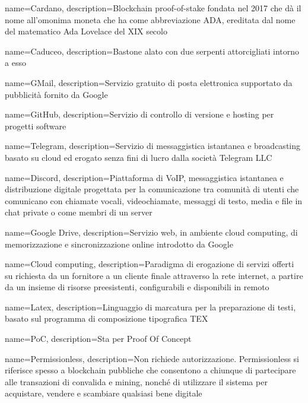 {
	name={Cardano},
	description={Blockchain\glo{} proof-of-stake fondata nel 2017 che dà il nome all'omonima moneta che ha come abbreviazione ADA, ereditata dal nome del matematico Ada Lovelace del XIX secolo}
}

{
	name={Caduceo},
	description={Bastone alato con due serpenti attorcigliati intorno a esso}
}

{
	name={GMail},
	description={Servizio gratuito di posta elettronica supportato da pubblicità fornito da Google}
}

{
	name={GitHub},
	description={Servizio di controllo di versione e hosting per progetti software}
}

{
	name={Telegram},
	description={Servizio di messaggistica istantanea e broadcasting basato su cloud ed erogato senza fini di lucro dalla società Telegram LLC}
}

{
	name={Discord},
	description={Piattaforma di VoIP, messaggistica istantanea e distribuzione digitale progettata per la comunicazione tra comunità di utenti che comunicano con chiamate vocali, videochiamate, messaggi di testo, media e file in chat private o come membri di un server}
}

{
	name={Google Drive},
	description={Servizio web, in ambiente cloud computing\glo{}, di memorizzazione e sincronizzazione online introdotto da Google}
}

{
	name={Cloud computing},
	description={Paradigma di erogazione di servizi offerti su richiesta da un fornitore a un cliente finale attraverso la rete internet, a partire da un insieme di risorse preesistenti, configurabili e disponibili in remoto}
}

{
	name={Latex},
	description={Linguaggio di marcatura per la preparazione di testi, basato sul programma di composizione tipografica TEX}
}

{
	name={PoC},
	description={Sta per Proof Of Concept\glo}
}

{
	name={Permissionless},
	description={Non richiede autorizzazione. Permissionless si riferisce spesso a blockchain pubbliche che consentono a chiunque di partecipare alle transazioni di convalida e mining, nonché di utilizzare il sistema per acquistare, vendere e scambiare qualsiasi bene digitale}
}

